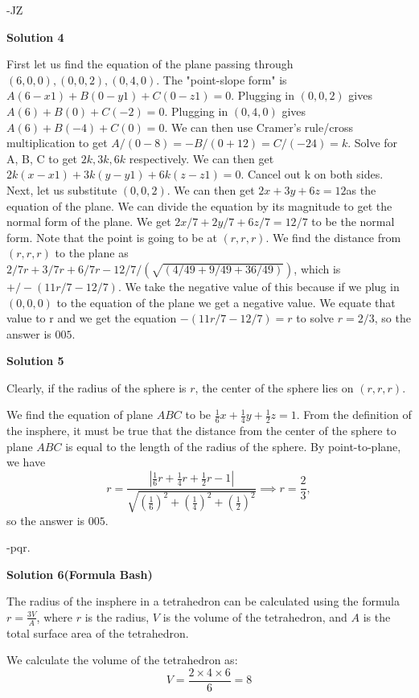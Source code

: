 \begin{enumerate}
 -JZ

 



\textbf{Solution 4}

First let us find the equation of the plane passing through $(6,0,0), (0,0,2), (0,4,0)$.  The "point-slope form" is $A(6-x1)+B(0-y1)+C(0-z1)=0.$ Plugging in $(0,0,2)$ gives $A(6)+B(0)+C(-2)=0.$  Plugging in $(0,4,0)$ gives $A(6)+B(-4)+C(0)=0.$  We can then use Cramer's rule/cross multiplication to get $A/(0-8)=-B/(0+12)=C/(-24)=k.$  Solve for A, B, C to get $2k, 3k, 6k$ respectively.  We can then get $2k(x-x1)+3k(y-y1)+6k(z-z1)=0.$  Cancel out k on both sides. Next, let us substitute $(0,0,2)$.  We can then get $2x+3y+6z=12$as the equation of the plane.  We can divide the equation by its magnitude to get the normal form of the plane.  We get $2x/7+2y/7+6z/7=12/7$ to be the normal form.  Note that the point is going to be at $(r,r,r).$  We find the distance from $(r,r,r)$ to the plane as $2/7r+3/7r+6/7r-12/7/(\sqrt{(4/49+9/49+36/49)})$, which is $+/-(11r/7-12/7)$.  We take the negative value of this because if we plug in $(0,0,0)$ to the equation of the plane we get a negative value.  We equate that value to r and we get the equation $-(11r/7-12/7)=r$ to solve $r={2/3}$, so the answer is $\boxed{005}$.

 



\textbf{Solution 5}

Clearly, if the radius of the sphere is $r$, the center of the sphere lies on $(r, r, r)$.

 We find the equation of plane $ABC$ to be $\frac16 x+\frac14 y+\frac12 z=1$. From the definition of the insphere, it must be true that the distance from the center of the sphere to plane $ABC$ is equal to the length of the radius of the sphere. By point-to-plane, we have 
 \[r=\frac{|\frac16 r+\frac14 r+\frac12 r-1|}{\sqrt{\left(\frac16\right)^2+\left(\frac14\right)^2+\left(\frac12\right)^2}} \implies r=\frac23,\] so the answer is $\boxed{005}$.

 -pqr.

 



\textbf{Solution 6(Formula Bash)}

The radius of the insphere in a tetrahedron can be calculated using the formula $r = \frac{3V}{A}$, where $r$ is the radius, $V$ is the volume of the tetrahedron, and $A$ is the total surface area of the tetrahedron.

 We calculate the volume of the tetrahedron as:
 \[V = \frac{2 \times 4 \times 6}{6} = 8\]


\end{enumerate}
